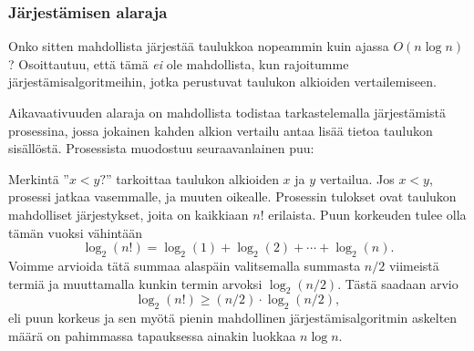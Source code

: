 \subsubsection{Järjestämisen alaraja}

Onko sitten mahdollista järjestää taulukkoa
nopeammin kuin ajassa $O(n \log n)$?
Osoittautuu, että tämä \emph{ei} ole mahdollista,
kun rajoitumme
järjestämis\-algoritmeihin,
jotka perustuvat taulukon alkioiden
vertailemiseen.

Aikavaativuuden alaraja on mahdollista todistaa
tarkastelemalla järjestämistä
prosessina, jossa jokainen kahden alkion vertailu
antaa lisää tietoa taulukon sisällöstä.
Prosessista muodostuu seuraavanlainen puu:

\begin{center}
\end{center}

Merkintä ''$x<y?$'' tarkoittaa taulukon alkioiden
$x$ ja $y$ vertailua.
Jos $x<y$, prosessi jatkaa vasemmalle,
ja muuten oikealle.
Prosessin tulokset ovat taulukon mahdolliset
järjestykset, joita on kaikkiaan $n!$ erilaista.
Puun korkeuden tulee olla tämän vuoksi vähintään
\[ \log_2(n!) = \log_2(1)+\log_2(2)+\cdots+\log_2(n).\]
Voimme arvioida tätä summaa alaspäin
valitsemalla summasta $n/2$
viimeistä termiä ja muuttamalla kunkin
termin arvoksi $\log_2(n/2)$.
Tästä saadaan arvio
\[ \log_2(n!) \ge (n/2) \cdot \log_2(n/2),\]
eli puun korkeus ja sen myötä
pienin mahdollinen järjestämisalgoritmin askelten
määrä on pahimmassa tapauksessa ainakin luokkaa $n \log n$.

